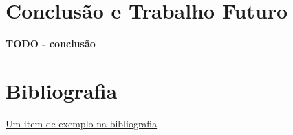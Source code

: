 \documentclass[12pt, a4paper]{article}
\begin{document}
\section{Conclusão e Trabalho Futuro}

\textbf{\color{red} TODO - conclusão}

\begingroup
\section{Bibliografia}
\renewcommand{\section}[2]{}

\begin{thebibliography}{9}
        \href{https://youtu.be/dQw4w9WgXcQ}{Um item de exemplo na bibliografia}
\end{thebibliography}
\endgroup
\end{document}
